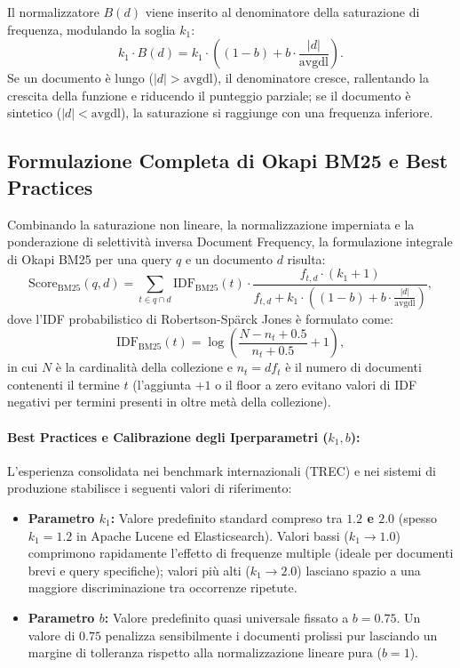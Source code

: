 Il normalizzatore $B(d)$ viene inserito al denominatore della saturazione di frequenza, modulando la soglia $k_1$:
\begin{equation}
k_1 \cdot B(d) = k_1 \cdot \left((1 - b) + b \cdot \frac{|d|}{\text{avgdl}}\right).
\end{equation}
Se un documento \`e lungo ($|d| > \text{avgdl}$), il denominatore cresce, rallentando la crescita della funzione e riducendo il punteggio parziale; se il documento \`e sintetico ($|d| < \text{avgdl}$), la saturazione si raggiunge con una frequenza inferiore.

\FloatBarrier
\subsection{Formulazione Completa di Okapi BM25 e Best Practices}
\label{subsec:bm25-formula-completa}
Combinando la saturazione non lineare, la normalizzazione imperniata e la ponderazione di selettivit\`a inversa Document Frequency, la formulazione integrale di Okapi BM25 per una query $q$ e un documento $d$ risulta:
\begin{equation}
\text{Score}_{\text{BM25}}(q, d) = \sum_{t \in q \cap d} \text{IDF}_{\text{BM25}}(t) \cdot \frac{f_{t,d} \cdot (k_1 + 1)}{f_{t,d} + k_1 \cdot \left((1 - b) + b \cdot \frac{|d|}{\text{avgdl}}\right)},
\label{eq:okapi-bm25-full}
\end{equation}
dove l'IDF probabilistico di Robertson-Sp\"arck Jones \`e formulato come:
\begin{equation}
\text{IDF}_{\text{BM25}}(t) = \log \left( \frac{N - n_t + 0.5}{n_t + 0.5} + 1 \right),
\end{equation}
in cui $N$ \`e la cardinalit\`a della collezione e $n_t = df_t$ \`e il numero di documenti contenenti il termine $t$ (l'aggiunta $+1$ o il floor a zero evitano valori di IDF negativi per termini presenti in oltre met\`a della collezione).

\paragraph{Best Practices e Calibrazione degli Iperparametri ($k_1, b$):}
L'esperienza consolidata nei benchmark internazionali (TREC) e nei sistemi di produzione stabilisce i seguenti valori di riferimento:
\begin{itemize}
    \item \textbf{Parametro $k_1$:} Valore predefinito standard compreso tra \textbf{$1.2$ e $2.0$} (spesso $k_1 = 1.2$ in Apache Lucene ed Elasticsearch). Valori bassi ($k_1 \to 1.0$) comprimono rapidamente l'effetto di frequenze multiple (ideale per documenti brevi e query specifiche); valori pi\`u alti ($k_1 \to 2.0$) lasciano spazio a una maggiore discriminazione tra occorrenze ripetute.
    \item \textbf{Parametro $b$:} Valore predefinito quasi universale fissato a \textbf{$b = 0.75$}. Un valore di $0.75$ penalizza sensibilmente i documenti prolissi pur lasciando un margine di tolleranza rispetto alla normalizzazione lineare pura ($b = 1$).
\end{itemize}

